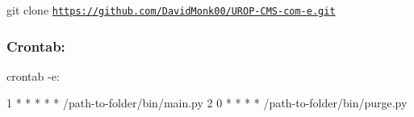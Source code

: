 \begin{DoxyItemize}
{\ttfamily git clone \href{https://github.com/DavidMonk00/UROP-CMS-com-e.git}{\tt https\+://github.\+com/\+David\+Monk00/\+U\+R\+O\+P-\/\+C\+M\+S-\/com-\/e.\+git}} \subsubsection*{Crontab\+:}

{\ttfamily crontab -\/e}\+: 
\begin{DoxyCode}
1 * * * * * /path-to-folder/bin/main.py
2 0 * * * * /path-to-folder/bin/purge.py
\end{DoxyCode}
 
\end{DoxyItemize}